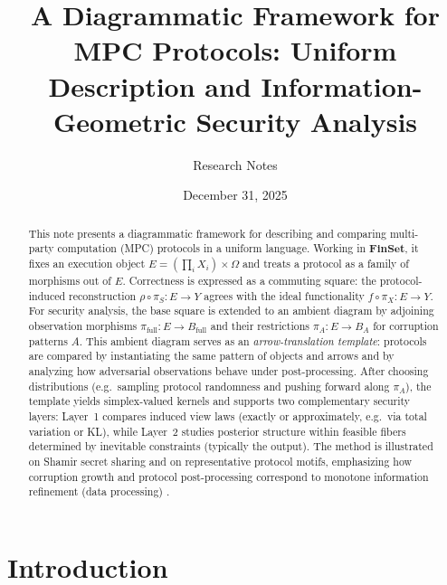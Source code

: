 \documentclass[11pt,a4paper]{article}
\title{A Diagrammatic Framework for MPC Protocols: Uniform Description and Information-Geometric Security Analysis}
\author{Research Notes}
\date{December 31, 2025}
\theoremstyle{definition}
\theoremstyle{plain}
\begin{document}
\maketitle

\begin{abstract}
This note presents a diagrammatic framework for describing and comparing multi-party computation (MPC) protocols in a uniform language. Working in $\mathbf{FinSet}$, it fixes an execution object $E=(\prod_i X_i)\times\Omega$ and treats a protocol as a family of morphisms out of $E$. Correctness is expressed as a commuting square: the protocol-induced reconstruction $\rho\circ\pi_S:E\to Y$ agrees with the ideal functionality $f\circ\pi_X:E\to Y$. For security analysis, the base square is extended to an ambient diagram by adjoining observation morphisms $\pi_{\mathrm{full}}:E\to B_{\mathrm{full}}$ and their restrictions $\pi_A:E\to B_A$ for corruption patterns $A$. This ambient diagram serves as an \emph{arrow-translation template}: protocols are compared by instantiating the same pattern of objects and arrows and by analyzing how adversarial observations behave under post-processing. After choosing distributions (e.g.\ sampling protocol randomness and pushing forward along $\pi_A$), the template yields simplex-valued kernels and supports two complementary security layers: Layer~1 compares induced view laws (exactly or approximately, e.g.\ via total variation or KL), while Layer~2 studies posterior structure within feasible fibers determined by inevitable constraints (typically the output). The method is illustrated on Shamir secret sharing \cite{Shamir1979} and on representative protocol motifs, emphasizing how corruption growth and protocol post-processing correspond to monotone information refinement (data processing) \cite{CoverThomas2006}.
\end{abstract}

\tableofcontents

\section{Introduction}
\end{document}
